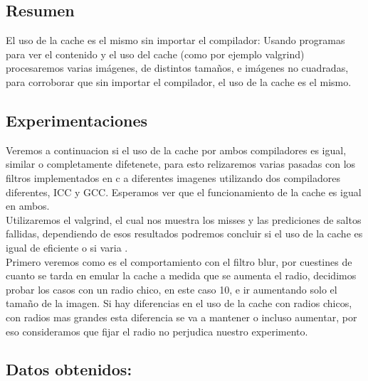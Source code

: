 \subsection{Resumen}

El uso de la cache es el mismo sin importar el compilador: Usando programas para ver el contenido y el uso del cache (como por ejemplo valgrind) procesaremos varias imágenes, de distintos tamaños, e imágenes no cuadradas, para corroborar que sin importar el compilador, el uso de la cache es el mismo. \\


\subsection{Experimentaciones}

Veremos a continuacion si el uso de la cache por ambos compiladores es igual, similar o completamente difetenete, para esto relizaremos varias pasadas con los filtros implementados en c a diferentes imagenes utilizando dos compiladores diferentes, ICC y GCC. Esperamos ver que el funcionamiento de la cache es igual en ambos. \\

Utilizaremos el valgrind, el cual nos muestra los misses y las prediciones de saltos fallidas, dependiendo de esos resultados podremos concluir si el uso de la cache es igual de eficiente o si varia . \\

Primero veremos como es el comportamiento con el filtro blur, por cuestines de cuanto se tarda en emular la cache a medida que se aumenta el radio, decidimos probar los casos con un radio chico, en este caso 10,  e ir aumentando solo el tamaño de la imagen. Si hay diferencias en el uso de la cache con radios chicos, con radios mas grandes esta diferencia se va a mantener o incluso aumentar, por eso consideramos que fijar el radio no perjudica nuestro experimento. \\

\subsection{Datos obtenidos:}

